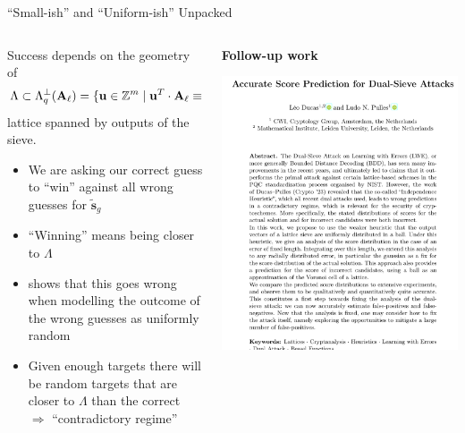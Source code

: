 \documentclass[xcolor=table,10pt,aspectratio=169]{beamer}
\renewcommand{\vec}[1]{\ensuremath{\mathbf{#1}}\xspace}
\providecommand{\mat}[1]{\ensuremath{\vec{#1}}\xspace}
\begin{document}
\begin{frame}[label={sec:org072f57d}]{``Small-ish'' and ``Uniform-ish'' Unpacked}
\begin{columns}
\begin{column}{0.5\columnwidth}
Success depends on the geometry of
\[
\Lambda \subset \Lambda_{q}^{\bot}(\mat{A}_{\ell})  = \{\vec{u} \in \ZZ^{m} \mid \vec{u}^{T} \cdot \mat{A}_{\ell} \equiv \vec{0} \bmod q\},
\]
lattice spanned by outputs of the sieve.

\begin{itemize}
\item We are asking our correct guess to ``win'' against all wrong guesses for \(\tilde{\vec{s}}_{g}\)
\item ``Winning'' means being closer to \(\Lambda\)
\item \cite{EPRINT:DucPul23} shows that this goes wrong when modelling the outcome of the wrong guesses as uniformly random
\item Given enough targets there will be random targets that are closer to \(\Lambda\) than the correct \(\Rightarrow\) ``contradictory regime''
\end{itemize}
\end{column}


\begin{column}{0.5\columnwidth}
\begin{center}
\textbf{Follow-up work}
\end{center}

\begin{center}
\includegraphics[keepaspectratio,height=.75\textheight]{./ludo.png}
\end{center}
\end{column}
\end{columns}
\end{frame}
\end{document}
